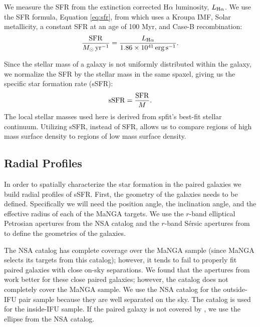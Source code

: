 \documentclass[iop,revtex4,twocolumn,apj,numberedappendix,appendixfloats]{emulateapj}
\begin{document}
We measure the SFR from the extinction corrected H$\alpha$ luminosity, $L_{{\rm H}\alpha}$.  We use the SFR formula, Equation \ref{eq:sfr}, from \citet{Murphy:2011} which uses a Kroupa IMF, Solar metallicity, a constant SFR at an age of 100 Myr, and Case-B recombination: 
\begin{equation}\label{eq:sfr}
\frac{\rm{SFR}}{M_{\odot} \, \rm{yr^{-1}}} = \frac{L_{\rm H\alpha}}{1.86 \times 10^{41}\, \rm{erg\,s}^{-1}}.
\end{equation}

Since the stellar mass of a galaxy is not uniformly distributed within the galaxy, we normalize the SFR by the stellar mass in the same spaxel, giving us the specific star formation rate (sSFR):
\begin{equation}
{\rm sSFR} = \frac{\rm SFR}{M}.
\end{equation}
The local stellar masses used here is derived from {\sc spfit}'s best-fit stellar continuum. Utilizing sSFR, instead of SFR, allows us to compare regions of high mass surface density to regions of low mass surface density. 

\subsection{Radial Profiles}\label{sec:radial}

In order to spatially characterize the star formation in the paired galaxies we build radial profiles of sSFR. First, the geometry of the galaxies needs to be defined. Specifically we will need the position angle, the inclination angle, and the effective radius of each of the MaNGA targets. We use the $r$-band elliptical Petrosian apertures from the NSA catalog and the $r$-band S\'ersic apertures from \citet{Simard:2011} to define the geometries of the galaxies. 

The NSA catalog has complete coverage over the MaNGA sample (since MaNGA selects its targets from this catalog); however, it tends to fail to properly fit paired galaxies with close on-sky separations. We found that the apertures from \citet{Simard:2011} work better for these close paired galaxies; however, the catalog does not completely cover the MaNGA sample. We use the NSA catalog for the outside-IFU pair sample because they are well separated on the sky. The \citet{Simard:2011} catalog is used for the inside-IFU sample. If the paired galaxy is not covered by \citet{Simard:2011}, we use the ellipse from the NSA catalog. 
\end{document}
